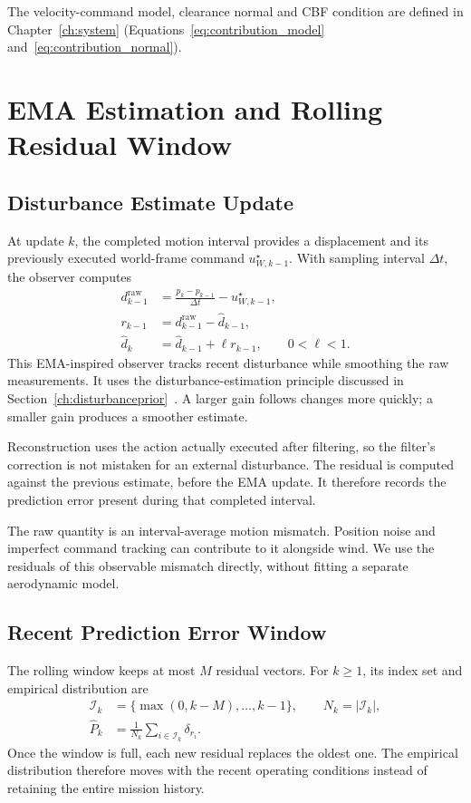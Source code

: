 The velocity-command model, clearance normal and CBF condition are defined in Chapter~\ref{ch:system} (Equations~\eqref{eq:contribution_model} and~\eqref{eq:contribution_normal}).

\section{EMA Estimation and Rolling Residual Window}

\subsection{Disturbance Estimate Update}

At update $k$, the completed motion interval provides a displacement and its previously executed world-frame command $u^\star_{W,k-1}$. With sampling interval $\Delta t$, the observer computes
\begin{align}
 d^{\mathrm{raw}}_{k-1}
 &=\frac{p_k-p_{k-1}}{\Delta t}-u^\star_{W,k-1},
 \label{eq:contribution_raw}\\
 r_{k-1}&=d^{\mathrm{raw}}_{k-1}-\hat d_{k-1},
 \label{eq:contribution_residual}\\
 \hat d_k&=\hat d_{k-1}+\ell r_{k-1},\qquad 0<\ell<1.
 \label{eq:contribution_observer}
\end{align}
This EMA-inspired observer tracks recent disturbance while smoothing the raw measurements. It uses the disturbance-estimation principle discussed in Section~\ref{ch:disturbanceprior}~\cite{litDOB1987,litDOB2015}. A larger gain follows changes more quickly; a smaller gain produces a smoother estimate.

Reconstruction uses the action actually executed after filtering, so the filter's correction is not mistaken for an external disturbance. The residual is computed against the previous estimate, before the EMA update. It therefore records the prediction error present during that completed interval.

The raw quantity is an interval-average motion mismatch. Position noise and imperfect command tracking can contribute to it alongside wind. We use the residuals of this observable mismatch directly, without fitting a separate aerodynamic model.

\subsection{Recent Prediction Error Window}

The rolling window keeps at most $M$ residual vectors. For $k\geq1$, its index set and empirical distribution are
\begin{equation}
\begin{aligned}
 \mathcal I_k&=\{\max(0,k-M),\ldots,k-1\},\qquad N_k=|\mathcal I_k|,\\
 \widehat P_k&=\frac1{N_k}\sum_{i\in\mathcal I_k}\delta_{r_i}.
\end{aligned}
\label{eq:contribution_empirical}
\end{equation}
Once the window is full, each new residual replaces the oldest one. The empirical distribution therefore moves with the recent operating conditions instead of retaining the entire mission history.

